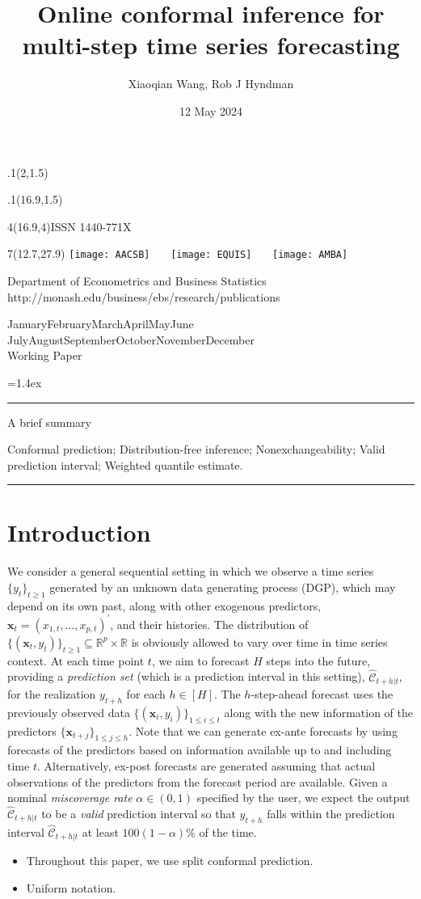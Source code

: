 \documentclass[
  11pt,
  a4paper,
]{article}
\title{Online conformal inference for multi-step time series
forecasting}
\date{12 May 2024}
\author{Xiaoqian Wang, Rob J Hyndman}
\makeatletter
\theoremstyle{plain}
\theoremstyle{plain}
\theoremstyle{remark}
\def\placefig#1#2#3#4{\begin{textblock}{.1}(#1,#2)\rlap{\texttt{[image: \#4]}}\end{textblock}}
\def\Date{\number\day}
\def\Month{\ifcase\month\or
 January\or February\or March\or April\or May\or June\or
 July\or August\or September\or October\or November\or December\fi}
\def\Year{\number\year}
\def\showjel{{\large\textsf{\textbf{JEL classification:}}~\@jel}}
\def\cover{{\sffamily\setcounter{page}{0}
        \thispagestyle{empty}
        \placefig{2}{1.5}{width=5cm}{monash2}
        \placefig{16.9}{1.5}{width=2.1cm}{MBSportrait}
        \begin{textblock}{4}(16.9,4)ISSN 1440-771X\end{textblock}
        \begin{textblock}{7}(12.7,27.9)\hfill
        \texttt{[image: AACSB]}~~~
        \texttt{[image: EQUIS]}~~~
        \texttt{[image: AMBA]}
        \end{textblock}
        \vspace*{2.5cm}
        \begin{center}\Large
        Department of Econometrics and Business Statistics\\[.5cm]
        \footnotesize http://monash.edu/business/ebs/research/publications
        \end{center}\vspace{2cm}
        \begin{center}
        \fbox{\parbox{14cm}{\begin{onehalfspace}\centering\Huge\vspace*{0.3cm}
                \textsf{\textbf{\expandafter{\@title}}}\vspace{1cm}\par
                \LARGE
                \expandafter{\@author}
                \end{onehalfspace}
        }}
        \end{center}
        \vfill
                \begin{center}\Large
                \Month~\Year\\[1cm]
                Working Paper \@wp
        \end{center}\vspace*{2cm}}}
\def\pageone{{\sffamily\setstretch{1}%
        \thispagestyle{empty}%
        \vbox to \textheight{%
        \raggedright\baselineskip=1.2cm
     {\fontsize{24.88}{30}\sffamily\textbf{\expandafter{\@title}}}
        \vspace{2cm}\par
        \hspace{1cm}\parbox{14cm}{\sffamily\large\@addresses}\vspace{1cm}\vfill
        \hspace{1cm}{\large\Date~\Month~\Year}\\[1cm]
        \hspace{1cm}\showjel\vss}}}
\def\blindtitle{{\sffamily
     \thispagestyle{plain}\raggedright\baselineskip=1.2cm
     {\fontsize{24.88}{30}\sffamily\textbf{\expandafter{\@title}}}\vspace{1cm}\par
        }}
\def\titlepage{{\cover\newpage\pageone\newpage\blindtitle}}
\let\maketitle\titlepage
\newenvironment{keywords}{\par\vspace{0.5cm}\noindent{\sffamily\textbf{Keywords:}}}{\vspace{0.25cm}\par\hrule\vspace{0.5cm}\par}
\renewenvironment{abstract}{\begin{minipage}{\textwidth}\parskip=1.4ex\noindent
\hrule\vspace{0.1cm}\par{\sffamily\textbf{\abstractname}}\newline\setstretch{1}}
  {\end{minipage}}
\makeatother
\begin{document}
\maketitle

\begin{abstract}
A brief summary
\end{abstract}

\begin{keywords}
  Conformal prediction; Distribution-free
inference; Nonexchangeability; Valid prediction interval; 
  Weighted quantile estimate.
\end{keywords}

\section{Introduction}\label{sec-intro}

We consider a general sequential setting in which we observe a time
series \(\{y_t\}_{t \geq 1}\) generated by an unknown data generating
process (DGP), which may depend on its own past, along with other
exogenous predictors, \(\bm{x}_t=(x_{1,t},\ldots,x_{p,t})^{\prime}\),
and their histories. The distribution of
\(\{(\bm{x}_t, y_t)\}_{t \geq 1} \subseteq \mathbb{R}^p \times \mathbb{R}\)
is obviously allowed to vary over time in time series context. At each
time point \(t\), we aim to forecast \(H\) steps into the future,
providing a \emph{prediction set} (which is a prediction interval in
this setting), \(\hat{\mathcal{C}}_{t+h|t}\), for the realization
\(y_{t+h}\) for each \(h\in[H]\). The \(h\)-step-ahead forecast uses the
previously observed data \(\{(\bm{x}_i, y_i)\}_{1 \leq i \leq t}\) along
with the new information of the predictors
\(\{\bm{x}_{t+j}\}_{1\leq j\leq h}\). Note that we can generate ex-ante
forecasts by using forecasts of the predictors based on information
available up to and including time \(t\). Alternatively, ex-post
forecasts are generated assuming that actual observations of the
predictors from the forecast period are available. Given a nominal
\emph{miscoverage rate} \(\alpha \in (0,1)\) specified by the user, we
expect the output \(\hat{\mathcal{C}}_{t+h|t}\) to be a \emph{valid}
prediction interval so that \(y_{t+h}\) falls within the prediction
interval \(\hat{\mathcal{C}}_{t+h|t}\) at least \(100(1-\alpha)\%\) of
the time.

\begin{itemize}
\item
  Throughout this paper, we use split conformal prediction.
\item
  Uniform notation.
\end{itemize}
\end{document}
